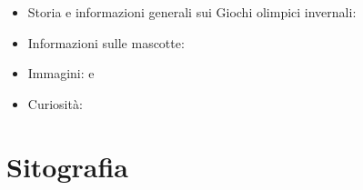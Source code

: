 \documentclass[
]{book}
\providecommand{\tightlist}{%
  \setlength{\itemsep}{0pt}\setlength{\parskip}{0pt}}
\begin{document}
\begin{itemize}
\tightlist
\item
  Storia e informazioni generali sui Giochi olimpici invernali: \citep{wikipedia}
\item
  Informazioni sulle mascotte: \citep{mascotte}
\item
  Immagini: \citep{ilpostfoto} e \citep{artevitae}
\item
  Curiosità: \citep{corriere}
\end{itemize}

\chapter*{Sitografia}\label{sitografia}

  
\end{document}
